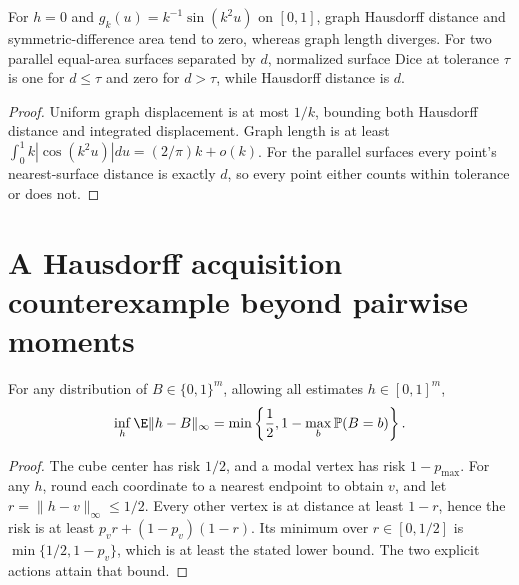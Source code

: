 \begin{counterexample}
\label{rthreegeo:areansd}
For $h=0$ and $g_k(u)=k^{-1}\sin(k^2u)$ on $[0,1]$, graph Hausdorff
distance and symmetric-difference area tend to zero, whereas graph
length diverges. For two parallel equal-area surfaces separated by $d$,
normalized surface Dice at tolerance $\tau$ is one for $d\le\tau$ and
zero for $d>\tau$, while Hausdorff distance is $d$.
\end{counterexample}
\begin{proof}
Uniform graph displacement is at most $1/k$, bounding both Hausdorff
distance and integrated displacement. Graph length is at least
$\int_0^1 k|\cos(k^2u)|du=(2/\pi)k+o(k)$.
For the parallel surfaces every point's nearest-surface distance is
exactly $d$, so every point either counts within tolerance or does not.
\end{proof}

\section{A Hausdorff acquisition counterexample beyond pairwise moments}

\begin{lemma}
\label{rthreegeo:cuberisk}
For any distribution of $B\in\{0,1\}^m$, allowing all estimates
$h\in[0,1]^m$,
\[
 \inf_h\E\|h-B\|_\infty
 =\min\left\{\frac12,1-\max_b\mathbb P(B=b)\right\}.
\]
\end{lemma}
\begin{proof}
The cube center has risk $1/2$, and a modal vertex has risk $1-p_{\max}$.
For any $h$, round each coordinate to a nearest endpoint to obtain $v$,
and let $r=\|h-v\|_\infty\le1/2$.
Every other vertex is at distance at least $1-r$, hence the risk is at
least $p_vr+(1-p_v)(1-r)$. Its minimum over $r\in[0,1/2]$ is
$\min\{1/2,1-p_v\}$, which is at least the stated lower bound.
The two explicit actions attain that bound.
\end{proof}

